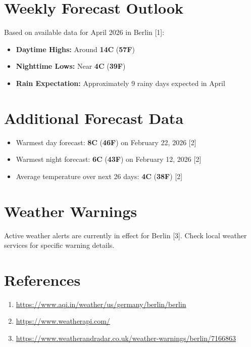 \documentclass{article}
\begin{document}
\section{Weekly Forecast Outlook}
Based on available data for April 2026 in Berlin [1]:
\begin{itemize}
    \item \textbf{Daytime Highs:} Around \textbf{14\textdegree{}C} (\textbf{57\textdegree{}F})
    \item \textbf{Nighttime Lows:} Near \textbf{4\textdegree{}C} (\textbf{39\textdegree{}F})
    \item \textbf{Rain Expectation:} Approximately 9 rainy days expected in April
\end{itemize}

\section{Additional Forecast Data}
\begin{itemize}
    \item Warmest day forecast: \textbf{8\textdegree{}C} (\textbf{46\textdegree{}F}) on February 22, 2026 [2]
    \item Warmest night forecast: \textbf{6\textdegree{}C} (\textbf{43\textdegree{}F}) on February 12, 2026 [2]
    \item Average temperature over next 26 days: \textbf{4\textdegree{}C} (\textbf{38\textdegree{}F}) [2]
\end{itemize}

\section{Weather Warnings}
Active weather alerts are currently in effect for Berlin [3]. Check local weather services for specific warning details.

\section{References}
\begin{enumerate}
    \item \url{https://www.aqi.in/weather/us/germany/berlin/berlin}
    \item \url{https://www.weatherapi.com/}
    \item \url{https://www.weatherandradar.co.uk/weather-warnings/berlin/7166863}
\end{enumerate}
\end{document}
